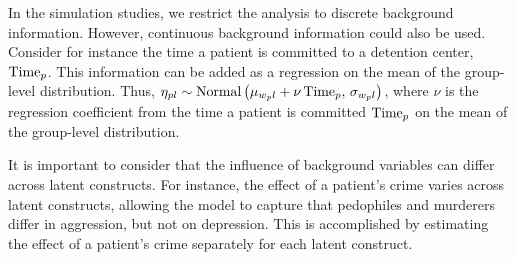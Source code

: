 \documentclass[a4paper,usenames,dvipsnames]{article}
\begin{document}
In the simulation studies, we restrict the analysis to discrete background information. However, continuous background information could also be used. Consider for instance the time a patient is committed to a detention center, $\mathrm{Time}_p$.  This information can be added as a regression on the mean of the group-level distribution. Thus, $\eta_{pl} \sim \text{Normal}\left(\mu_{w_pl} + \nu\,\mathrm{Time}_p,\,\sigma_{w_pl}\right)$, where $\nu$ is the regression coefficient from the time a patient is committed $\mathrm{Time}_p$ on the mean of the group-level distribution.

It is important to consider that the influence of background variables can differ across latent constructs. For instance, the effect of a patient's crime varies across latent constructs, allowing the model to capture that pedophiles and murderers differ in aggression, but not on depression. This is accomplished by estimating the effect of a patient's crime separately for each latent construct.
\end{document}
